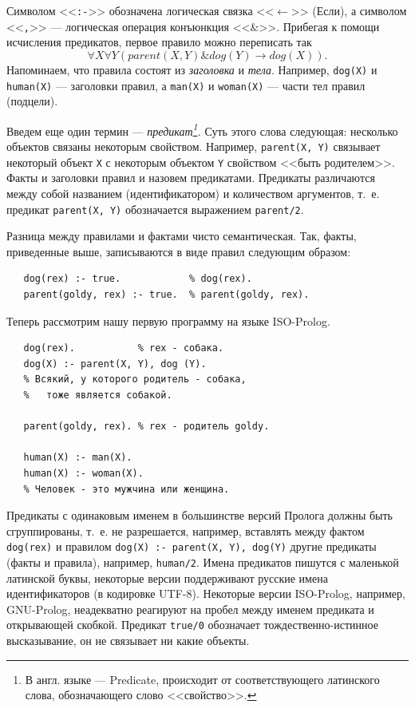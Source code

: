 \documentclass[12pt, openany, twoside]{book} %
\begin{document}
\noindent Символом <<{\tt :-}>> обозначена логическая связка <<$\leftarrow$>> (Если), а символом <<{\tt ,}>> --- логическая операция конъюнкция <<$\&$>>. Прибегая к помощи исчисления предикатов, первое правило можно переписать так
$$
    \forall X \forall Y (parent(X, Y) \& dog(Y) \to dog(X)).
$$
Напоминаем, что правила состоят из {\em заголовка} и {\em тела}. Например, {\tt dog(X)} и {\tt human(X)} --- заголовки правил, а {\tt man(X)} и {\tt woman(X)} --- части тел правил (подцели).

Введем еще один термин --- {\em предикат\footnote{В англ. языке --- Predicate, происходит от соответствующего латинского слова, обозначающего слово <<свойство>>.}.} Суть этого слова следующая: несколько объектов связаны некоторым свойством. Например, {\tt parent(X, Y)} связывает некоторый объект {\tt X} с некоторым объектом {\tt Y} свойством <<быть родителем>>. Факты и заголовки правил и назовем предикатами. Предикаты различаются между собой названием (идентификатором) и количеством аргументов, т.~е. предикат {\tt parent(X, Y)} обозначается выражением {\tt parent/2}.

Разница между правилами и фактами чисто семантическая. Так, факты, приведенные выше, записываются в виде правил следующим образом:
{\tt\begin{verbatim}
   dog(rex) :- true.            % dog(rex).
   parent(goldy, rex) :- true.  % parent(goldy, rex).
\end{verbatim}}

Теперь рассмотрим нашу первую программу на языке ISO-Prolog.
{\tt\begin{verbatim}
   dog(rex).           % rex - собака.
   dog(X) :- parent(X, Y), dog (Y).
   % Всякий, у которого родитель - собака,
   %   тоже является собакой.

   parent(goldy, rex). % rex - родитель goldy.

   human(Х) :- man(Х).
   human(Х) :- woman(Х).
   % Человек - это мужчина или женщина.
\end{verbatim}}
Предикаты с одинаковым именем в большинстве версий Пролога должны быть сгруппированы, т.~е. не разрешается, например, вставлять между фактом {\tt dog(rex)} и правилом {\tt dog(X) :- parent(X, Y), dog(Y)} другие предикаты (факты и правила), например, {\tt human/2}. Имена предикатов пишутся с маленькой латинской буквы, некоторые версии поддерживают русские имена идентификаторов (в кодировке UTF-8). Некоторые версии ISO-Prolog, например, GNU-Prolog, неадекватно реагируют на пробел между именем предиката и открывающей скобкой.  Предикат {\tt true/0} обозначает тождественно-истинное высказывание, он не связывает ни какие объекты.
\end{document}

